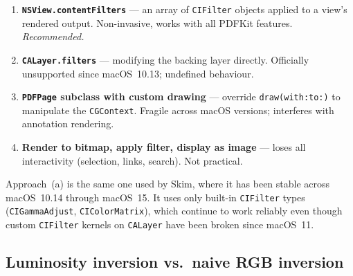 \documentclass[11pt,a4paper]{article}
\begin{document}
\begin{enumerate}[label=(\alph*)]
    \item \textbf{\texttt{NSView.contentFilters}} --- an array of
        \texttt{CIFilter} objects applied to a view's rendered output.
        Non-invasive, works with all PDFKit features. \emph{Recommended.}
    \item \textbf{\texttt{CALayer.filters}} --- modifying the backing layer
        directly. Officially unsupported since macOS~10.13; undefined behaviour.
    \item \textbf{\texttt{PDFPage} subclass with custom drawing} --- override
        \texttt{draw(with:to:)} to manipulate the \texttt{CGContext}. Fragile
        across macOS versions; interferes with annotation rendering.
    \item \textbf{Render to bitmap, apply filter, display as image} --- loses
        all interactivity (selection, links, search). Not practical.
\end{enumerate}

Approach~(a) is the same one used by Skim, where it has been stable across
macOS~10.14 through macOS~15. It uses only built-in \texttt{CIFilter} types
(\texttt{CIGammaAdjust}, \texttt{CIColorMatrix}), which continue to work
reliably even though custom \texttt{CIFilter} kernels on \texttt{CALayer} have
been broken since macOS~11.

\subsection{Luminosity inversion vs.\ naive RGB inversion}
\end{document}
